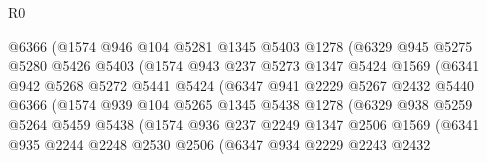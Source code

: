\begin{lexlean}{R0}
\begin{coremodule}
                        @6366
                        (@1574
                          @946
                          @104
                          @5281
                          @1345
                          @5403
                          @1278
                          (@6329
                            @945
                            @5275
                            @5280
                            @5426
                            @5403
                            (@1574
                              @943
                              @237
                              @5273
                              @1347
                              @5424
                              @1569
                              (@6341
                                @942
                                @5268
                                @5272
                                @5441
                                @5424
                                (@6347
                                  @941
                                  @2229
                                  @5267
                                  @2432
                                  @5440
                                  @6366
                                  (@1574
                                    @939
                                    @104
                                    @5265
                                    @1345
                                    @5438
                                    @1278
                                    (@6329
                                      @938
                                      @5259
                                      @5264
                                      @5459
                                      @5438
                                      (@1574
                                        @936
                                        @237
                                        @2249
                                        @1347
                                        @2506
                                        @1569
                                        (@6341
                                          @935
                                          @2244
                                          @2248
                                          @2530
                                          @2506
                                          (@6347
                                            @934
                                            @2229
                                            @2243
                                            @2432

\end{coremodule}
\end{lexlean}
